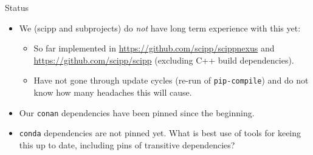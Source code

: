 \documentclass[english,aspectratio=1610,smaller]{beamer}
\begin{document}
\begin{frame}{Status}
  \begin{itemize}
    \item We (scipp and subprojects) do \emph{not} have long term experience with this yet:
      \begin{itemize}
        \item So far implemented in \url{https://github.com/scipp/scippnexus} and \url{https://github.com/scipp/scipp} (excluding C++ build dependencies).
        \item Have not gone through update cycles (re-run of \texttt{pip-compile}) and do not know how many headaches this will cause.
      \end{itemize}
    \item Our \texttt{conan} dependencies have been pinned since the beginning.
    \item \texttt{conda} dependencies are not pinned yet. What is best use of tools for keeing this up to date, including pins of transitive dependencies?
  \end{itemize}
\end{frame}
\end{document}
